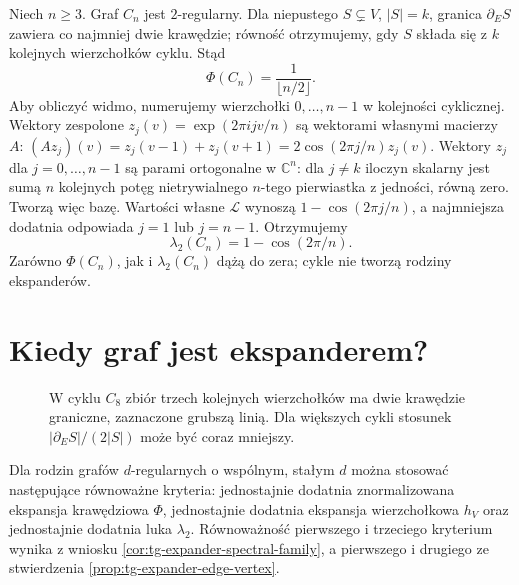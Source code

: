 \begin{przyklad}[Cykl]
\label{ex:tg-expander-cycle}
Niech $n\geq3$.
Graf $C_n$ jest $2$-regularny.
Dla niepustego
$S\subsetneq V$, $|S|=k$,
granica $\partial_ES$
zawiera co najmniej
dwie krawędzie;
równość otrzymujemy,
gdy $S$ składa się
z $k$ kolejnych
wierzchołków cyklu.
Stąd
\[
\Phi(C_n)=\frac1{\lfloor n/2\rfloor}.
\]
Aby obliczyć widmo,
numerujemy wierzchołki
$0,\ldots,n-1$
w kolejności cyklicznej.
Wektory zespolone
$z_j(v)=\exp(2\pi ijv/n)$
są wektorami własnymi
macierzy $A$:
$(Az_j)(v)=z_j(v-1)+z_j(v+1)
=2\cos(2\pi j/n)z_j(v)$.
Wektory $z_j$ dla $j=0,\ldots,n-1$ są parami
ortogonalne w $\mathbb C^n$: dla $j\ne k$ iloczyn
skalarny jest sumą $n$ kolejnych potęg nietrywialnego
$n$-tego pierwiastka z jedności, równą zero.
Tworzą więc bazę. Wartości własne $\mathcal L$ wynoszą
$1-\cos(2\pi j/n)$, a najmniejsza dodatnia odpowiada
$j=1$ lub $j=n-1$. Otrzymujemy
\[
\lambda_2(C_n)
=1-\cos(2\pi/n).
\]
Zarówno $\Phi(C_n)$,
jak i $\lambda_2(C_n)$
dążą do zera;
cykle nie tworzą
rodziny ekspanderów.
\end{przyklad}



\section{Kiedy graf jest ekspanderem?}
\label{sec:tg-expanders-criteria}

\begin{figure}[htbp]
\centering
{}
\caption{W cyklu $C_8$ zbiór trzech kolejnych
wierzchołków ma dwie krawędzie graniczne,
zaznaczone grubszą linią.
Dla większych cykli stosunek
$|\partial_ES|/(2|S|)$ może być coraz mniejszy.}
\label{fig:tg-expander-cycle-cut}
\end{figure}


Dla rodzin grafów $d$-regularnych
o wspólnym, stałym $d$
można stosować następujące
równoważne kryteria:
jednostajnie dodatnia
znormalizowana ekspansja
krawędziowa $\Phi$,
jednostajnie dodatnia
ekspansja wierzchołkowa $h_V$
oraz jednostajnie dodatnia
luka $\lambda_2$.
Równoważność pierwszego
i trzeciego kryterium
wynika z wniosku
\ref{cor:tg-expander-spectral-family},
a pierwszego i drugiego
ze stwierdzenia
\ref{prop:tg-expander-edge-vertex}.

